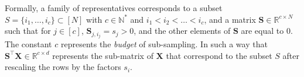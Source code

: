 \documentclass[twoside,11pt]{book}
\numberwithin{theorem}{chapter}
\numberwithin{definition}{chapter}
\numberwithin{proposition}{chapter}
\numberwithin{corollary}{chapter}
\numberwithin{example}{chapter}
\numberwithin{lemma}{chapter}
\numberwithin{assumption}{chapter}
\numberwithin{equation}{chapter}
\numberwithin{figure}{chapter}
\DeclareMathOperator{\Tran}{\intercal}
\begin{document}
 Formally, a family of representatives 
 corresponds to a subset $S = \{i_{1}, \dots, i_{c} \} \subset [N]$ with $c \in \mathbb{N}^{*}$ and $i_{1} < i_{2} < \dots < i_{c}$, and a matrix $\bm{S} \in \mathbb{R}^{c \times N}$ such that for $j \in [c]$, 
 $\bm{S}_{j,i_{j}}  = s_{j}>0$, and the other elements of $\bm{S}$ are equal to $0$. The constant $c$ represents the \emph{budget} of sub-sampling.
  In such a way that $\bm{S}^{\Tran}\bm{X} \in \mathbb{R}^{c \times d}$ represents the sub-matrix of $\bm{X}$ that correspond to the subset $S$ after rescaling the rows by the factors $s_{i}$.
\end{document}
